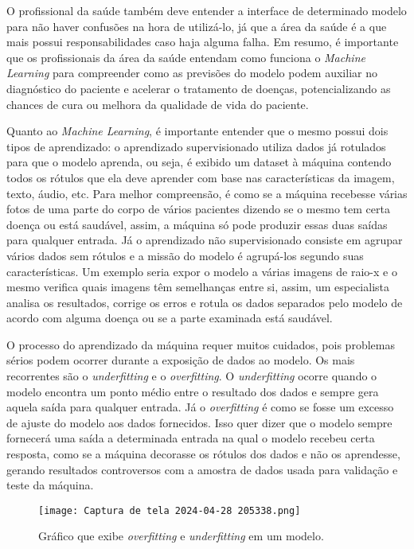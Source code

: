 \documentclass[journal]{IEEEtran}
\begin{document}
O profissional da saúde também deve entender a interface de determinado modelo para não haver confusões na hora de utilizá-lo, já que a área da saúde é a que mais possui responsabilidades caso haja alguma falha. Em resumo, é importante que os profissionais da área da saúde entendam como funciona o \emph{Machine Learning} para compreender como as previsões do modelo podem auxiliar no diagnóstico do paciente e acelerar o tratamento de doenças, potencializando as chances de cura ou melhora da qualidade de vida do paciente.

Quanto ao \emph{Machine Learning}, é importante entender que o mesmo possui dois tipos de aprendizado: o aprendizado supervisionado utiliza dados já rotulados para que o modelo aprenda, ou seja, é exibido um dataset à máquina contendo todos os rótulos que ela deve aprender com base nas características da imagem, texto, áudio, etc. Para melhor compreensão, é como se a máquina recebesse várias fotos de uma parte do corpo de vários pacientes dizendo se o mesmo tem certa doença ou está saudável, assim, a máquina só pode produzir essas duas saídas para qualquer entrada. Já o aprendizado não supervisionado consiste em agrupar vários dados sem rótulos e a missão do modelo é agrupá-los segundo suas características. Um exemplo seria expor o modelo a várias imagens de raio-x e o mesmo verifica quais imagens têm semelhanças entre si, assim, um especialista analisa os resultados, corrige os erros e rotula os dados separados pelo modelo de acordo com alguma doença ou se a parte examinada está saudável.

O processo do aprendizado da máquina requer muitos cuidados, pois problemas sérios podem ocorrer durante a exposição de dados ao modelo. Os mais recorrentes são o \emph{underfitting} e o \emph{overfitting}. O \emph{underfitting} ocorre quando o modelo encontra um ponto médio entre o resultado dos dados e sempre gera aquela saída para qualquer entrada. Já o \emph{overfitting} é como se fosse um excesso de ajuste do modelo aos dados fornecidos. Isso quer dizer que o modelo sempre fornecerá uma saída a determinada entrada na qual o modelo recebeu certa resposta, como se a máquina decorasse os rótulos dos dados e não os aprendesse, gerando resultados controversos com a amostra de dados usada para validação e teste da máquina.
\begin{figure}[h]
    \centering
    \texttt{[image: Captura de tela 2024-04-28 205338.png]}
    \caption{Gráfico que exibe \emph{overfitting} e \emph{underfitting} em um modelo. \cite{didatica2023}}
    \label{fig:exemplo}
\end{figure}
\end{document}
